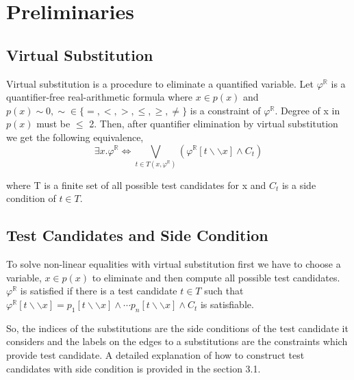 \section{Preliminaries}
\label{sec:preliminaries}
\subsection{Virtual Substitution}
Virtual substitution is a procedure to eliminate a quantified variable. Let $\varphi^\mathbb{R}$ is a quantifier-free real-arithmetic formula where $x\in p(x)$ and $p(x) \sim 0, \sim \in \{=,<,>,\leq,\geq,\neq\}$ is a constraint of   $\varphi^\mathbb{R}$. Degree of x in $p(x)$ must be $\leq$ 2. Then, after quantifier elimination by virtual substitution we get the following equivalence,
$$ \exists x. \varphi^\mathbb{R} \Longleftrightarrow \bigvee\limits_{t\in T(x,\varphi^\mathbb{R})}  (\varphi^\mathbb{R} [t\backslash\backslash x] \wedge C_t)$$

where T is a finite set of all possible test candidates for x and $C_t$ is a side condition of $t \in T$.
\subsection{Test Candidates and Side Condition}
To solve non-linear equalities with virtual substitution first we have to choose a variable, $x\in p(x)$ to eliminate and then compute all possible test candidates. $\varphi^\mathbb{R}$ is satisfied if there is a test candidate $t\in T$ such that $\varphi^\mathbb{R} [t\backslash\backslash x] = p_1[t\backslash\backslash x] \wedge \cdots p_n[t\backslash\backslash x] \wedge C_t$ is satisfiable.

So, the indices of the substitutions are the side conditions of the test candidate it considers and the labels on the edges to a substitutions are the constraints which provide test candidate. A detailed explanation of how to construct test candidates with side condition is provided in the section 3.1.
